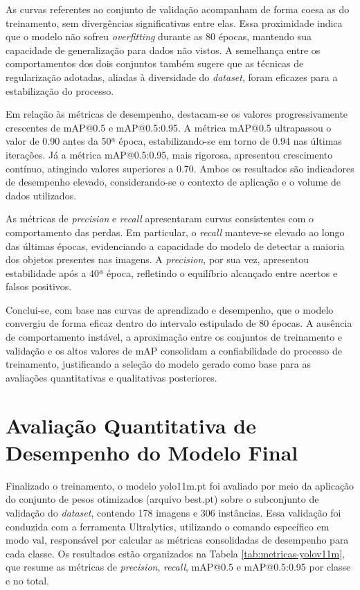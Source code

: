 As curvas referentes ao conjunto de validação acompanham de forma coesa as do treinamento, sem divergências significativas entre elas. Essa proximidade indica que o modelo não sofreu \textit{overfitting} durante as 80 épocas, mantendo sua capacidade de generalização para dados não vistos. A semelhança entre os comportamentos dos dois conjuntos também sugere que as técnicas de regularização adotadas, aliadas à diversidade do \textit{dataset}, foram eficazes para a estabilização do processo.

Em relação às métricas de desempenho, destacam-se os valores progressivamente crescentes de mAP@0.5 e mAP@0.5:0.95. A métrica mAP@0.5 ultrapassou o valor de 0.90 antes da 50ª época, estabilizando-se em torno de 0.94 nas últimas iterações. Já a métrica mAP@0.5:0.95, mais rigorosa, apresentou crescimento contínuo, atingindo valores superiores a 0.70. Ambos os resultados são indicadores de desempenho elevado, considerando-se o contexto de aplicação e o volume de dados utilizados.

As métricas de \textit{precision} e \textit{recall} apresentaram curvas consistentes com o comportamento das perdas. Em particular, o \textit{recall} manteve-se elevado ao longo das últimas épocas, evidenciando a capacidade do modelo de detectar a maioria dos objetos presentes nas imagens. A \textit{precision}, por sua vez, apresentou estabilidade após a 40ª época, refletindo o equilíbrio alcançado entre acertos e falsos positivos.

Conclui-se, com base nas curvas de aprendizado e desempenho, que o modelo convergiu de forma eficaz dentro do intervalo estipulado de 80 épocas. A ausência de comportamento instável, a aproximação entre os conjuntos de treinamento e validação e os altos valores de mAP consolidam a confiabilidade do processo de treinamento, justificando a seleção do modelo gerado como base para as avaliações quantitativas e qualitativas posteriores.

\section{\textbf{Avaliação Quantitativa de Desempenho do Modelo Final}}

Finalizado o treinamento, o modelo yolo11m.pt foi avaliado por meio da aplicação do conjunto de pesos otimizados (arquivo best.pt) sobre o subconjunto de validação do \textit{dataset}, contendo 178 imagens e 306 instâncias. Essa validação foi conduzida com a ferramenta Ultralytics, utilizando o comando específico em modo val, responsável por calcular as métricas consolidadas de desempenho para cada classe. Os resultados estão organizados na Tabela \ref{tab:metricas-yolov11m}, que resume as métricas de \textit{precision}, \textit{recall}, mAP@0.5 e mAP@0.5:0.95 por classe e no total.

